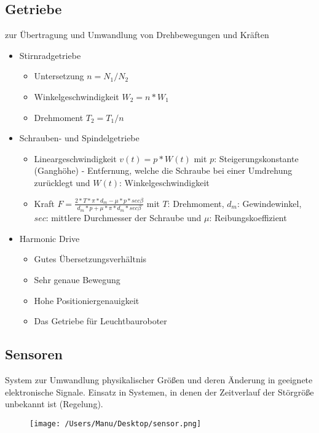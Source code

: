 \documentclass[paper=a4, fontsize=11pt]{scrartcl} %
\numberwithin{equation}{section} %
\numberwithin{figure}{section} %
\numberwithin{table}{section} %
\begin{document}
\subsection{Getriebe}

zur Übertragung und Umwandlung von Drehbewegungen und Kräften

\begin{itemize}
\item Stirnradgetriebe
\begin{itemize}
\item Untersetzung $n = N_1 / N_2$
\item Winkelgeschwindigkeit $W_2 = n * W_1$
\item Drehmoment $T_2 = T_1 / n$
\end{itemize}
\item Schrauben- und Spindelgetriebe
\begin{itemize}
\item Lineargeschwindigkeit $v(t) = p * W(t)$ mit $p$: Steigerungskonstante (Ganghöhe) - Entfernung, welche die Schraube bei einer Umdrehung zurücklegt und $W(t)$: Winkelgeschwindigkeit
\item Kraft $F = \frac{2 * T * \pi * d_m - \mu * p * sec \beta}{d_m * p + \mu * \pi * d_m * sec \beta}$ mit $T$: Drehmoment, $d_m$: Gewindewinkel, $sec$: mittlere Durchmesser der Schraube und $\mu$: Reibungskoeffizient
\end{itemize}
\item Harmonic Drive
\begin{itemize}
\item Gutes Übersetzungsverhältnis
\item Sehr genaue Bewegung
\item Hohe Positioniergenauigkeit
\item Das Getriebe für Leuchtbauroboter
\end{itemize}
\end{itemize}

\subsection{Sensoren}

System zur Umwandlung physikalischer Größen und deren Änderung in geeignete elektronische Signale. Einsatz in Systemen, in denen der Zeitverlauf der Störgröße unbekannt ist (Regelung).\newpage

\begin{figure}
    \centering
    \texttt{[image: /Users/Manu/Desktop/sensor.png]}
\end{figure}
\end{document}
